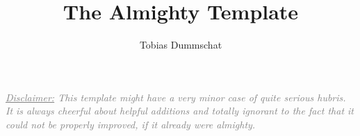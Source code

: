 \documentclass[11pt]{article}
\title{The Almighty Template}
\author{Tobias Dummschat}
\newcommand\1{\mathds{1}}
\newcommand\ul\underline
\theoremstyle{definition}
\begin{document}
\maketitle
\section*{}

\it{\textcolor{gray}{\ul{Disclaimer:} This template might have a very minor case of quite serious hubris. It is always cheerful about helpful additions and totally ignorant to the fact that it could not be properly improved, if it already were almighty.}}
\end{document}
